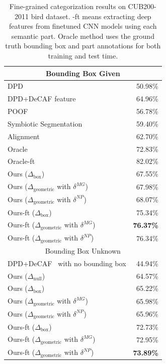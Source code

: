 \begin{table}[t]
\centering
\caption{Fine-grained categorization results on CUB200-2011 bird dataset. -ft means extracting deep features from finetuned CNN models using each semantic part. Oracle method uses the ground truth bounding box and part annotations for both training and test time. } 
\begin{tabular}{|l|r|}
\hline
\multicolumn{2}{|c|}{Bounding Box Given} \\
\hline
DPD~\cite{dpd} & 50.98\% \\
DPD+DeCAF feature ~\cite{decaf} & 64.96\% \\
POOF~\cite{poof} & 56.78\% \\
Symbiotic Segmentation~\cite{iccv13_symbiotic} & 59.40\% \\
Alignment~\cite{iccv13_alignment} & 62.70\%\\
\hline
Oracle & 72.83\% \\
Oracle-ft & 82.02\%\\
\hline
Ours ($\Delta_{\mathrm{box}}$) & 67.55\% \\
Ours ($\Delta_{\mathrm{geometric}}$ with $\delta^{MG}$) & 67.98\% \\
Ours ($\Delta_{\mathrm{geometric}}$ with $\delta^{NP}$) & 68.07\% \\
Ours-ft ($\Delta_{\mathrm{box}}$) & 75.34\% \\
Ours-ft ($\Delta_{\mathrm{geometric}}$ with $\delta^{MG}$) &  \textbf{76.37\%}\\
Ours-ft ($\Delta_{\mathrm{geometric}}$ with $\delta^{NP}$) & 76.34\%\\
\hline
\hline
\multicolumn{2}{|c|}{Bounding Box Unknown} \\
\hline
DPD+DeCAF~\cite{decaf} with no bounding box & 44.94\% \\
Ours ($\Delta_{\mathrm{null}}$) & 64.57\% \\
Ours ($\Delta_{\mathrm{box}}$)& 65.22\% \\
Ours ($\Delta_{\mathrm{geometric}}$ with $\delta^{MG}$) &65.98\% \\
Ours ($\Delta_{\mathrm{geometric}}$ with $\delta^{NP}$) & 65.96\% \\
Ours-ft ($\Delta_{\mathrm{box}}$)& 72.73\% \\
Ours-ft ($\Delta_{\mathrm{geometric}}$ with $\delta^{MG}$) & 72.95\% \\
Ours-ft ($\Delta_{\mathrm{geometric}}$ with $\delta^{NP}$) & \textbf{73.89\%} \\
\hline
\end{tabular}
\label{tab:finegrainedres}
\end{table}

